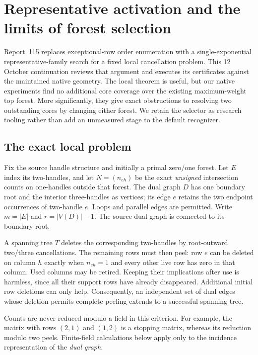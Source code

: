 \section{Representative activation and the limits of forest selection}
\label{sec:representative-activation}

Report~115 replaces exceptional-row order enumeration with a
single-exponential representative-family search for a fixed local
cancellation problem.  This 12 October continuation reviews that argument
and executes its certificates against the maintained native geometry.
The local theorem is useful, but our native experiments find no additional
core coverage over the existing maximum-weight top forest.  More
significantly, they give exact obstructions to resolving two outstanding
cores by changing either forest.  We retain the selector as research
tooling rather than add an unmeasured stage to the default recognizer.

\subsection{The exact local problem}

Fix the source handle structure and initially a primal zero/one forest.
Let $E$ index its two-handles, and let $N=(n_{eh})$ be the exact
\emph{unsigned} intersection counts on one-handles outside that forest.
The dual graph $D$ has one boundary root and the interior three-handles
as vertices; its edge $e$ retains the two endpoint occurrences of
two-handle $e$.  Loops and parallel edges are permitted.  Write $m=|E|$
and $r=|V(D)|-1$.  The source dual graph is connected to its boundary root.

A spanning tree $T$ deletes the corresponding two-handles by root-outward
two/three cancellations.  The remaining rows must then peel: row $e$ can
be deleted on column $h$ exactly when $n_{eh}=1$ and every other live row
has zero in that column.  Used columns may be retired.  Keeping their
implications after use is harmless, since all their support rows have
already disappeared.  Additional initial row deletions can only help.
Consequently, an independent set of dual edges whose deletion permits
complete peeling extends to a successful spanning tree.

Counts are never reduced modulo a field in this criterion.  For example,
the matrix with rows $(2,1)$ and $(1,2)$ is a stopping matrix, whereas
its reduction modulo two peels.  Finite-field calculations below apply
only to the incidence representation of the \emph{dual graph}.

